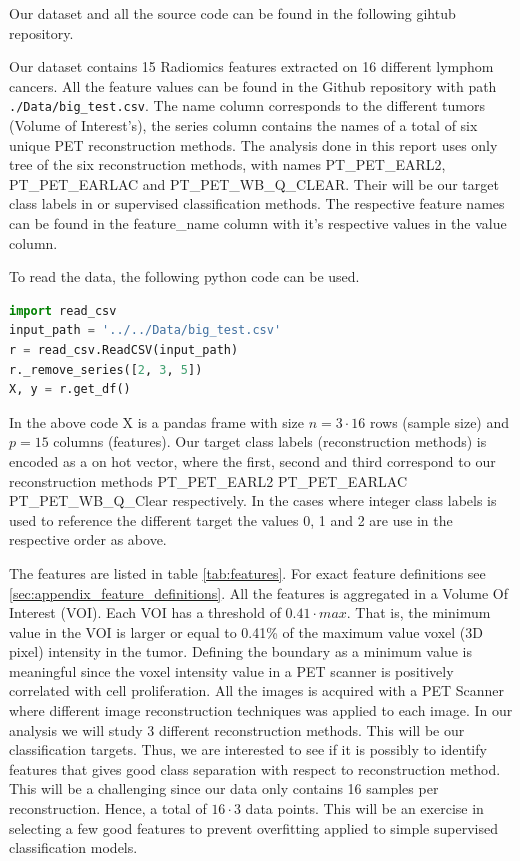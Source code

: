Our dataset and all the source code can be found in the following gihtub
repository. 

Our dataset contains 15 Radiomics features extracted on 16 different lymphom
cancers. All the feature values can be found in the Github repository with path
\verb|./Data/big_test.csv|. The name column corresponds to the different tumors
(Volume of Interest's), the series column contains the names of a total of six
unique PET reconstruction methods. The analysis done in this report uses only
tree of the six reconstruction methods, with names PT\_PET\_EARL2,
PT\_PET\_EARLAC and PT\_PET\_WB\_Q\_CLEAR. Their will be our target class
labels in or supervised classification methods. The respective feature names
can be found in the feature\_name column with it's respective values in the
value column.  

To read the data, the following python code can be used. 
\begin{lstlisting}[language=Python]
import read_csv
input_path = '../../Data/big_test.csv'
r = read_csv.ReadCSV(input_path)
r._remove_series([2, 3, 5])
X, y = r.get_df()
\end{lstlisting}
In the above code X is a pandas frame with size $n=3 \cdot 16$ rows (sample
size) and $p = 15$ columns (features). Our target class labels (reconstruction
methods) is encoded as a
on hot vector, where the first, second and third correspond to our
reconstruction methods 
PT\_PET\_EARL2  PT\_PET\_EARLAC  PT\_PET\_WB\_Q\_Clear respectively. In the
cases where integer class labels is used to reference the different target the
values 0, 1 and 2 are use in the respective order as above. 

The features are listed in table \ref{tab:features}. For exact feature
definitions see \ref{sec:appendix_feature_definitions}. All the features is
aggregated in a Volume Of Interest (VOI). Each VOI has a
threshold of $0.41 \cdot max$. 
That is, the minimum value in the VOI is larger or equal to 0.41\% of the
maximum value voxel (3D pixel) intensity in the tumor. Defining the boundary as a minimum
value is meaningful since the voxel intensity value in a PET scanner
is positively correlated with cell proliferation. 
All the images is acquired with a PET Scanner %
where different image reconstruction techniques was applied to each image. In our analysis we will study 3
different reconstruction methods. This will be our classification
targets. Thus, we are interested to see if it is possibly to identify features
that gives good class separation with respect to reconstruction method. This
will be a challenging since our data only contains 16 samples per
reconstruction. Hence, a total of $16 \cdot 3$ data points. 
This will be an exercise in selecting a few good features to prevent
overfitting applied to simple supervised classification models.   


